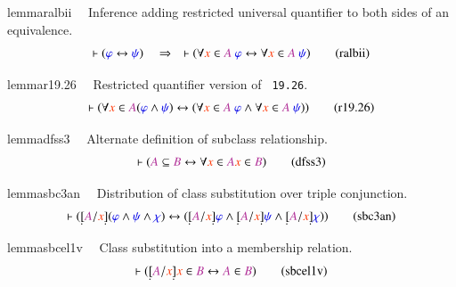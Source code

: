 \begin{restatable}{lemma}{ralbii}~~ Inference adding restricted universal
quantifier to both sides of an
       equivalence.  ~  ~  ~
\begin{align}
\vdash ( \mw{\varphi} \leftrightarrow \mw{\psi} )\quad\Rightarrow\quad \vdash (
    \forall \msc{x} \in \mc{A}~\mw{\varphi} \leftrightarrow \forall \msc{x} \in
    \mc{A}~\mw{\psi} )\label{eq:ralbii}\tag{ralbii}
\end{align}
\end{restatable}

\begin{restatable}{lemma}{r19.26}~~ Restricted quantifier version of {\tt
19.26}.  ~  ~
\begin{align}
\vdash ( \forall \msc{x} \in \mc{A} ( \mw{\varphi} \wedge \mw{\psi} )
    \leftrightarrow ( \forall \msc{x} \in \mc{A}~\mw{\varphi} \wedge \forall
    \msc{x} \in \mc{A}~\mw{\psi} ) )\label{eq:r19.26}\tag{r19.26}
\end{align}
\end{restatable}

\begin{restatable}{lemma}{dfss3}~~ Alternate definition of subclass
relationship.  ~
\begin{align}
\vdash ( \mc{A} \subseteq \mc{B} \leftrightarrow \forall \msc{x} \in \mc{A}
    \msc{x} \in \mc{B} )\label{eq:dfss3}\tag{dfss3}
\end{align}
\end{restatable}

\begin{restatable}{lemma}{sbc3an}~~ Distribution of class substitution over
triple conjunction.  
\begin{align}
\vdash ( \underaccent{\dot}{[} \mc{A} / \msc{x} \underaccent{\dot}{]} (
    \mw{\varphi} \wedge \mw{\psi} \wedge \mw{\chi} ) \leftrightarrow (
    \underaccent{\dot}{[} \mc{A} / \msc{x} \underaccent{\dot}{]} \mw{\varphi}
    \wedge \underaccent{\dot}{[} \mc{A} / \msc{x} \underaccent{\dot}{]}
    \mw{\psi} \wedge \underaccent{\dot}{[} \mc{A} / \msc{x}
    \underaccent{\dot}{]} \mw{\chi} ) )\label{eq:sbc3an}\tag{sbc3an}
\end{align}
\end{restatable}

\begin{restatable}{lemma}{sbcel1v}~~ Class substitution into a membership
relation.  
\begin{align}
\vdash ( \underaccent{\dot}{[} \mc{A} / \msc{x} \underaccent{\dot}{]} \msc{x}
    \in \mc{B} \leftrightarrow \mc{A} \in \mc{B}
    )\label{eq:sbcel1v}\tag{sbcel1v}
\end{align}
\end{restatable}

